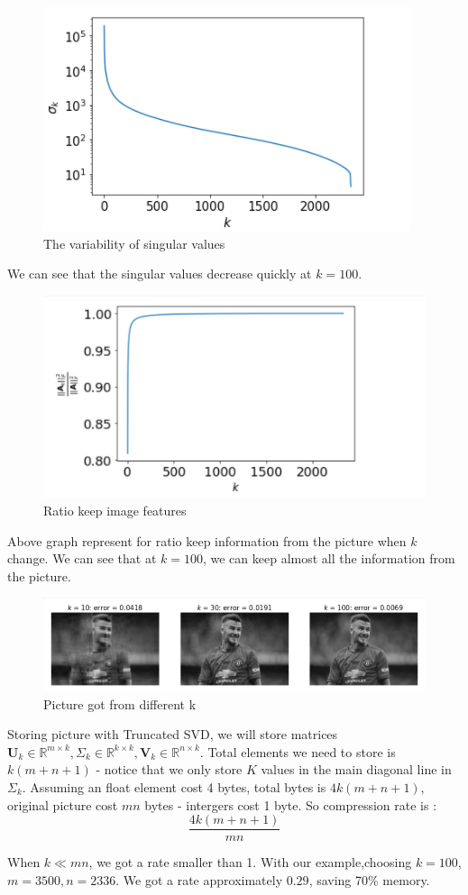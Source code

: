 \documentclass[a4paper, 12pt]{report}
\begin{document}
\begin{figure}[H]
    \center
    \includegraphics[]{sigma_image.png}
    \caption{The variability of singular values}
\end{figure}
We can see that the singular values decrease quickly at $k = 100$.
\begin{figure}[H]
    \center
    \includegraphics[]{true_ratio.png}
    \caption{Ratio keep image features}
\end{figure}
Above graph represent for ratio keep information from the picture when $k$ change. We can see that at $k = 100$, we can keep almost all the information from the picture.
\begin{figure}[H]
    \center
    \includegraphics[scale = 0.7]{choose_k.png}
    \caption{Picture got from different k}
\end{figure}

Storing picture with Truncated SVD, we will store matrices $\mathbf{U}_k \in \mathbb{R}^{m \times k}, \Sigma_k \in \mathbb{R}^{k \times k}, \mathbf{V}_k \in \mathbb{R}^{n \times k}$. Total elements we need to store is $k(m + n + 1)$ - notice that we only store $K$ values in the main diagonal line in $\Sigma_k$. Assuming an float element cost 4 bytes, total bytes is $ 4k(m + n + 1)$, original picture cost $ mn $ bytes - intergers cost 1 byte. So compression rate is : $$ \frac{4k(m + n + 1)}{mn} $$
\indent \par When $ k \ll mn $, we got a rate smaller than 1. With our example,choosing $k = 100$,$  m =3500 ,n = 2336$. We got a rate approximately $0.29$, saving 70\% memory.
\end{document}
